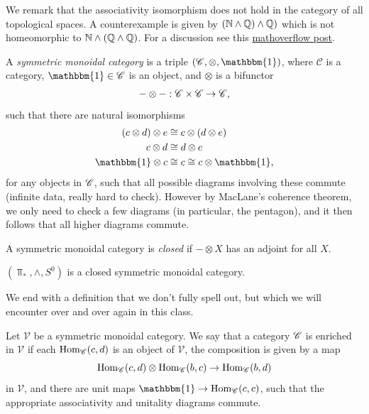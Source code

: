 \documentclass{article}[11pt]
\newcommand{\smashprod}{\wedge} %
\begin{document}
We remark that the associativity isomorphism does not hold in the category of all topological spaces. A counterexample is given by $(\N\smashprod \Q)\smashprod \Q)$ which is not homeomorphic to $\N\smashprod (\Q \smashprod \Q)$. For a discussion see this \href{https://mathoverflow.net/questions/196084/counterexample-for-associativity-of-smash-product}{mathoverflow post}.




\begin{definition} A \textit{symmetric monoidal category} is a triple $(\C,\otimes,\mathbbm{1})$, where $\mathscr{C}$ is a category, $\mathbbm{1}\in \mathscr{C}$ is an object, and $\otimes$ is a bifunctor
\begin{align*}
	- \otimes - : \mathscr{C} \times \mathscr{C} \to \mathscr{C},
\end{align*}
such that there are natural isomorphisms
\begin{align*}
	(c\otimes d)\otimes e &\cong c\otimes (d\otimes e) \\
	c\otimes d & \cong d\otimes c \\
	\mathbbm{1} \otimes c &\cong c \cong c\otimes \mathbbm{1},
\end{align*}
for any objects in $\mathscr{C}$, such that all possible diagrams involving these commute (infinite data, really hard to check). However by MacLane's coherence theorem, we only need to check a few diagrams (in particular, the pentagon), and it then follows that all higher diagrams commute.
\end{definition}

\begin{definition} A symmetric monoidal category is \textit{closed} if $-\otimes X$ has an adjoint for all $X$.
\end{definition}

\begin{proposition} $(\Top_\ast, \smashprod, S^0)$ is a closed symmetric monoidal category.
\end{proposition}

We end with a definition that we don't fully spell out, but which we will encounter over and over again in this class. 

\begin{definition}
Let $\mathscr{V}$ be a symmetric monoidal category. We say that a category $\mathscr{C}$ is enriched in $\mathscr{V}$ if each $\textup{Hom}_{\mathscr{C}}(c,d)$ is an object of $\mathscr{V}$,  the composition is given by a map
$$\textup{Hom}_{\mathscr{C}}(c,d)\otimes \textup{Hom}_{\mathscr{C}}(b,c)\to \textup{Hom}_{\mathscr{C}}(b,d)$$ in $\mathscr{V}$, and there are unit maps $\mathbbm{1}\to \Hom_\C(c,c)$, such that the appropriate associativity and unitality diagrams commute.
\end{definition}
\end{document}
